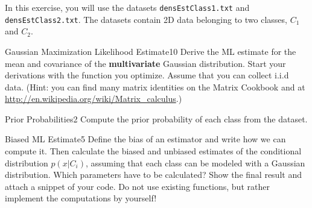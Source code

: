 \newif\ifvimbug
\vimbugfalse

\ifvimbug

\fi

In this exercise, you will use the datasets \texttt{densEstClass1.txt} 
and \texttt{densEstClass2.txt}. The datasets contain 2D data belonging
to two classes, $C_1$ and $C_2$.

\begin{questions}


\begin{question}{Gaussian Maximization Likelihood Estimate}{10}
Derive the ML estimate for the mean and covariance of the \textbf{multivariate} Gaussian distribution. Start your derivations with the function you optimize. Assume that you can collect i.i.d data. (Hint: you can find many matrix identities on the Matrix Cookbook and at \url{http://en.wikipedia.org/wiki/Matrix_calculus}.)

\begin{answer}

\end{answer}

\end{question}



\begin{question}{Prior Probabilities}{2}
Compute the prior probability of each class from the dataset. 

\begin{answer}

\end{answer}

\end{question}



\begin{question}{Biased ML Estimate}{5}
Define the bias of an estimator and write how we can compute it.
Then calculate the biased and unbiased estimates of the conditional distribution $p(x|C_i)$, assuming that each class can be modeled with a Gaussian distribution. Which parameters have to be calculated?
Show the final result and attach a snippet of your code.
Do not use existing functions, but rather implement the computations by yourself!

\begin{answer}


\end{answer}
\end{question}
\end{questions}
